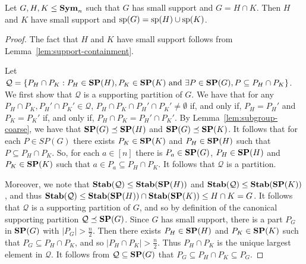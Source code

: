 \documentclass[../paper.tex]{subfiles}
\begin{document}
\begin{lem}
  Let $G, H, K \leq \text{\textbf{Sym}}_n$ such that $G$ has small support and $G = H \cap K$.
  Then $H$ and $K$ have small support and $\text{sp}(G) = \text{sp}(H) \cup
  \text{sp}(K)$.
  \label{lem:row-column-supports-well-behaved}
\end{lem}
\begin{proof}
  The fact that $H$ and $K$ have small support follows from
  Lemma~\ref{lem:support-containment}.

  Let $\mathcal{Q} = \{P_H \cap P_K : P_H \in \text{\textbf{SP}}(H), P_K \in \text{\textbf{SP}}(K) \text{ and
  } \exists P \in \text{\textbf{SP}}(G), P \subseteq P_H \cap P_K \}$. We first show that
  $\mathcal{Q}$ is a supporting partition of $G$. We have that for any $P_H \cap
  P_K, P_H' \cap P_K' \in \mathcal{Q}$, $P_H \cap P_K \cap P_H' \cap P_K' \neq
  \emptyset$ if, and only if, $P_H = P_H'$ and $P_K = P_K'$ if, and only if,
  $P_H \cap P_K = P_H' \cap P_K'$. By Lemma~\ref{lem:subgroup-coarse}, we have
  that $\text{\textbf{SP}}(G) \preceq \text{\textbf{SP}}(H)$ and $\text{\textbf{SP}}(G) \preceq \text{\textbf{SP}}(K)$. It follows that for
  each $P \in SP(G)$ there exists $P_K \in \text{\textbf{SP}}(K)$ and $P_H \in \text{\textbf{SP}}(H)$ such
  that $P \subseteq P_H \cap P_K$. So, for each $a \in [n]$ there is $P_a \in
  \text{\textbf{SP}}(G)$, $P_H \in \text{\textbf{SP}}(H)$ and $P_K \in \text{\textbf{SP}}(K)$ such that $a \in P_a \subseteq
  P_H \cap P_K$. It follows that $\mathcal{Q}$ is a partition.

  Moreover, we note that $\text{\textbf{Stab}}(\mathcal{Q}) \leq \text{\textbf{Stab}}(\text{\textbf{SP}}(H))$ and
  $\text{\textbf{Stab}}(\mathcal{Q}) \leq \text{\textbf{Stab}}(\text{\textbf{SP}}(K))$, and thus $\text{\textbf{Stab}}(\mathcal{Q}) \leq
  \text{\textbf{Stab}}(\text{\textbf{SP}}(H)) \cap \text{\textbf{Stab}}(\text{\textbf{SP}}(K)) \leq H \cap K = G$. It follows that
  $\mathcal{Q}$ is a supporting partition of $G$, and so by definition of the
  canonical supporting partition $\mathcal{Q} \preceq \text{\textbf{SP}} (G)$. Since $G$ has
  small support, there is a part $P_G$ in $\text{\textbf{SP}}(G)$ with $|P_G| > \frac{n}{2}$.
  Then there exists $P_H \in \text{\textbf{SP}}(H)$ and $P_K \in \text{\textbf{SP}}(K)$ such that $P_G
  \subseteq P_H \cap P_K$, and so $\vert P_H \cap P_K \vert > \frac{n}{2}$. Thus
  $P_H \cap P_K$ is the unique largest element in $\mathcal{Q}$. It follows from
  $\mathcal{Q} \subseteq \text{\textbf{SP}}(G)$ that $P_G \subseteq P_H \cap P_K \subseteq
  P_G$.



\end{proof}
\end{document}
